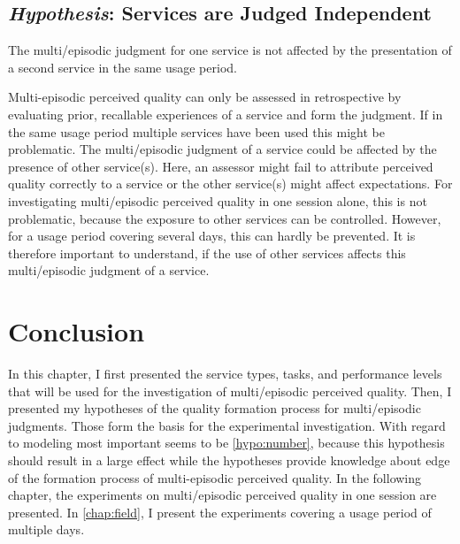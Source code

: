\subsection[H7: Services are Judged Independent]{\emph{Hypothesis}: Services are Judged Independent}
\begin{hypothesis}\label{hypo:independent}
The multi\-/episodic judgment for one service is not affected by the presentation of a second service in the same usage period.
\end{hypothesis}

Multi-episodic perceived quality can only be assessed in retrospective by evaluating prior, recallable experiences of a service and form the judgment.
If in the same usage period multiple services have been used this might be problematic.
The multi\-/episodic judgment of a service could be affected by the presence of other service(s).
Here, an assessor might fail to attribute perceived quality correctly to a service or the other service(s) might affect expectations.
For investigating multi\-/episodic perceived quality in one session alone, this is not problematic, because the exposure to other services can be controlled.
However, for a usage period covering several days, this can hardly be prevented.
It is therefore important to understand, if the use of other services affects this multi\-/episodic judgment of a service.

\section{Conclusion}
In this chapter, I first presented the service types, tasks, and performance levels that will be used for the investigation of multi\-/episodic perceived quality.
Then, I presented my hypotheses of the quality formation process for multi\-/episodic judgments.
Those form the basis for the experimental investigation.
With regard to modeling most important seems to be \autoref{hypo:number}, because this hypothesis should result in a large effect while the hypotheses provide knowledge about edge of the formation process of multi-episodic perceived quality.
In the following chapter, the experiments on multi\-/episodic perceived quality in one session are presented.
In \autoref{chap:field}, I present the experiments covering a usage period of multiple days. 
